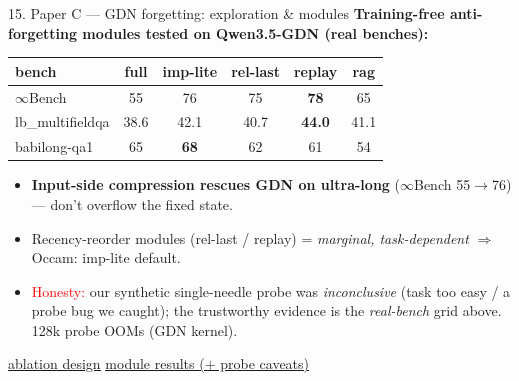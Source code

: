 \documentclass[aspectratio=169]{beamer}
\newcommand{\ghbase}{https://github.com/BDeMo/research-notes/blob/main/notes/plans/08-compressed-context-memory}
\newcommand{\ghC}[2]{\href{\ghbase/papers/paper-c-linear-attention/#1}{\color{blue}\underline{#2}}}
\newcommand{\best}[1]{\textbf{#1}}
\begin{document}
\begin{frame}{15. Paper C --- GDN forgetting: exploration \& modules}
  \textbf{Training-free anti-forgetting modules tested on Qwen3.5-GDN (real benches):}
  \centering\scriptsize
  \begin{tabular}{lccccc}
  \toprule
  bench & full & imp-lite & rel-last & replay & rag \\
  \midrule
  $\infty$Bench & 55 & 76 & 75 & \best{78} & 65 \\
  lb\_multifieldqa & 38.6 & 42.1 & 40.7 & \best{44.0} & 41.1 \\
  babilong-qa1 & 65 & \best{68} & 62 & 61 & 54 \\
  \bottomrule
  \end{tabular}
  \vspace{0.4em}
  \begin{itemize}\footnotesize
    \item \best{Input-side compression rescues GDN on ultra-long} ($\infty$Bench 55$\to$76) --- don't overflow the fixed state.
    \item Recency-reorder modules (rel-last / replay) = \emph{marginal, task-dependent} $\Rightarrow$ Occam: imp-lite default.
    \item \textcolor{red}{Honesty:} our synthetic single-needle probe was \emph{inconclusive} (task too easy / a probe bug we caught); the trustworthy evidence is the \emph{real-bench} grid above. 128k probe OOMs (GDN kernel).
  \end{itemize}
  \begin{block}{}\footnotesize \ghC{gdn-forgetting-exploration.md}{ablation design} \; \ghC{gdn-module-results-2026-07-14.md}{module results (+ probe caveats)}\end{block}
\end{frame}

\end{document}
